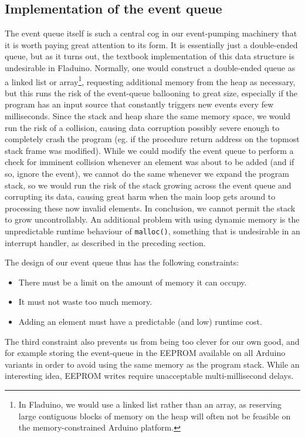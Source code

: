 \documentclass[a4paper, oneside, final]{memoir}
\begin{document}
\subsection{Implementation of the event queue}
\label{sec:event_queue}
The event queue itself is such a central cog in our event-pumping
machinery that it is worth paying great attention to its form.  It is
essentially just a double-ended queue, but as it turns out, the
textbook implementation of this data structure is undesirable in
Fladuino.  Normally, one would construct a double-ended queue as a
linked list or array\footnote{In Fladuino, we would use a linked list
  rather than an array, as reserving large contiguous blocks of memory
  on the heap will often not be feasible on the memory-constrained
  Arduino platform.}, requesting additional memory from the heap as
necessary, but this runs the risk of the event-queue ballooning to
great size, especially if the program has an input source that
constantly triggers new events every few milliseconds.  Since the
stack and heap share the same memory space, we would run the risk of a
collision, causing data corruption possibly severe enough to
completely crash the program (eg. if the procedure return address on
the topmost stack frame was modified).  While we could modify the
event queue to perform a check for imminent collision whenever an
element was about to be added (and if so, ignore the event), we cannot
do the same whenever we expand the program stack, so we would run the
risk of the stack growing across the event queue and corrupting its
data, causing great harm when the main loop gets around to processing
these now invalid elements.  In conclusion, we cannot permit the stack
to grow uncontrollably.  An additional problem with using dynamic
memory is the unpredictable runtime behaviour of \texttt{malloc()},
something that is undesirable in an interrupt handler, as described in
the preceding section.

The design of our event queue thus has the following constraints:

\begin{itemize}
\item There must be a limit on the amount of memory it can occupy.
\item It must not waste too much memory.
\item Adding an element must have a predictable (and low) runtime
  cost.
\end{itemize}

The third constraint also prevents us from being too clever for our
own good, and for example storing the event-queue in the EEPROM
available on all Arduino variants in order to avoid using the same
memory as the program stack.  While an interesting idea, EEPROM writes
require unacceptable multi-millisecond delays.
\end{document}
